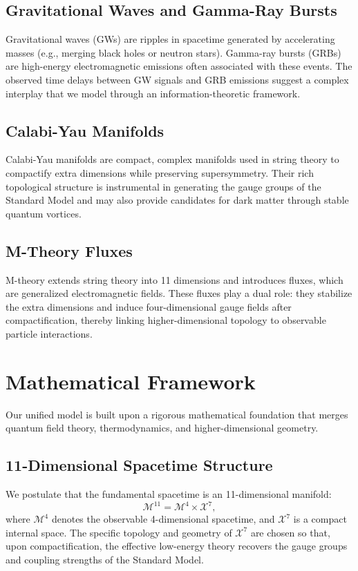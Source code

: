 \documentclass[12pt, a4paper]{article}
\begin{document}
\subsection{Gravitational Waves and Gamma-Ray Bursts}
Gravitational waves (GWs) are ripples in spacetime generated by accelerating masses (e.g., merging black holes or neutron stars). Gamma-ray bursts (GRBs) are high-energy electromagnetic emissions often associated with these events. The observed time delays between GW signals and GRB emissions suggest a complex interplay that we model through an information-theoretic framework.

\subsection{Calabi-Yau Manifolds}
Calabi-Yau manifolds are compact, complex manifolds used in string theory to compactify extra dimensions while preserving supersymmetry. Their rich topological structure is instrumental in generating the gauge groups of the Standard Model and may also provide candidates for dark matter through stable quantum vortices.

\subsection{M-Theory Fluxes}
M-theory extends string theory into 11 dimensions and introduces fluxes, which are generalized electromagnetic fields. These fluxes play a dual role: they stabilize the extra dimensions and induce four-dimensional gauge fields after compactification, thereby linking higher-dimensional topology to observable particle interactions.

\section{Mathematical Framework}
Our unified model is built upon a rigorous mathematical foundation that merges quantum field theory, thermodynamics, and higher-dimensional geometry.

\subsection{11-Dimensional Spacetime Structure}
We postulate that the fundamental spacetime is an 11-dimensional manifold:
\begin{equation}
    \mathcal{M}^{11} = \mathcal{M}^4 \times \mathcal{X}^7,
\end{equation}
where \(\mathcal{M}^4\) denotes the observable 4-dimensional spacetime, and \(\mathcal{X}^7\) is a compact internal space. The specific topology and geometry of \(\mathcal{X}^7\) are chosen so that, upon compactification, the effective low-energy theory recovers the gauge groups and coupling strengths of the Standard Model.
\end{document}
